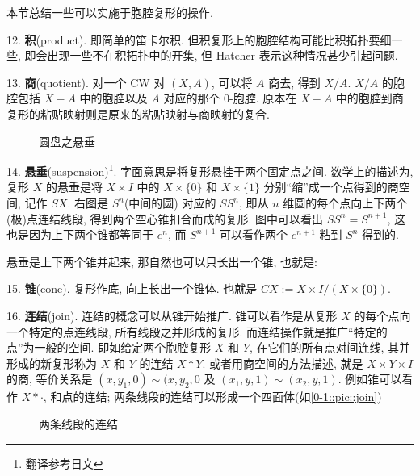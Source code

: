 本节总结一些可以实施于胞腔复形的操作.

12. {\bf 积}(product). 即简单的笛卡尔积. 但积复形上的胞腔结构可能比积拓扑要细一些, 即会出现一些不在积拓扑中的开集, 但 Hatcher 表示这种情况甚少引起问题.

13. {\bf 商}(quotient). 对一个 CW 对 $(X, A)$, 可以将 $A$ 商去, 得到 $X / A$. $X / A$ 的胞腔包括 $X - A$ 中的胞腔以及 $A$ 对应的那个 $0$-胞腔. 原本在 $X - A$ 中的胞腔到商复形的粘贴映射则是原来的粘贴映射与商映射的复合. 

\begin{wrapfigure}{r}{2cm}

\captionsetup{font=footnotesize}
\caption{圆盘之悬垂}
\end{wrapfigure}
14. {\bf 悬垂}(suspension)\footnote{翻译参考日文}. 字面意思是将复形悬挂于两个固定点之间. 数学上的描述为, 复形 $X$ 的悬垂是将 $X \times I$ 中的 $X \times \{0\}$ 和 $X \times \{1\}$ 分别``缩''成一个点得到的商空间, 记作 $SX$. 右图是 $S^n$(中间的圆) 对应的 $S S^n$, 即从 $n$ 维圆的每个点向上下两个(极)点连结线段, 得到两个空心锥扣合而成的复形. 图中可以看出 $S S^n = S^{n + 1}$, 这也是因为上下两个锥都等同于 $e^n$, 而 $S^{n + 1}$ 可以看作两个 $e^{n + 1}$ 粘到 $S^{n}$ 得到的. 

悬垂是上下两个锥并起来, 那自然也可以只长出一个锥, 也就是:

15. {\bf 锥}(cone). 复形作底, 向上长出一个锥体. 也就是 $CX := X \times I / (X \times \{0\})$.

16. {\bf 连结}(join). 连结的概念可以从锥开始推广. 锥可以看作是从复形 $X$ 的每个点向一个特定的点连线段, 所有线段之并形成的复形. 而连结操作就是推广``特定的点''为一般的空间. 即如给定两个胞腔复形 $X$ 和 $Y$, 在它们的所有点对间连线, 其并形成的新复形称为 $X$ 和 $Y$ 的连结 $X \ast Y$. 或者用商空间的方法描述, 就是 $X \times Y \times I$ 的商, 等价关系是 $(x, y_1, 0) \sim (x, y_2, 0$ 及 $(x_1, y, 1) \sim (x_2, y, 1)$. 例如锥可以看作 $X \ast \cdot$, 和点的连结; 两条线段的连结可以形成一个四面体(如\autoref{0-1::pic::join})

\begin{figure}[h]

\caption{两条线段的连结}
\end{figure}